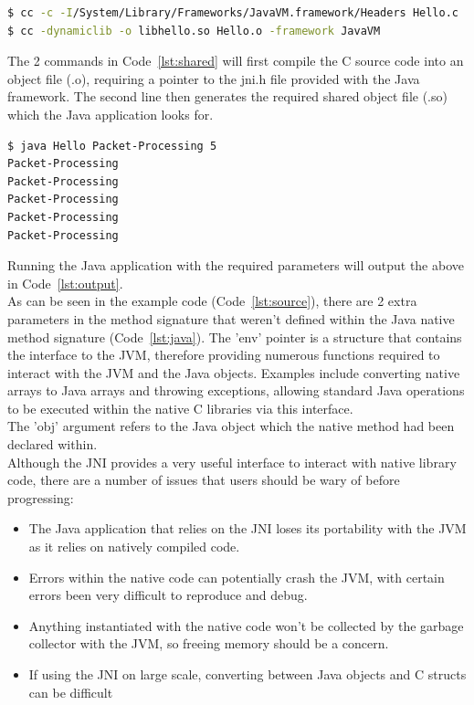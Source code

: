 \documentclass[a4paper, titlepage]{article}
\begin{document}
\begin{lstlisting}[language=sh, caption={Terminal commands to generate shared library file (.so)}, label=lst:shared]
$ cc -c -I/System/Library/Frameworks/JavaVM.framework/Headers Hello.c
$ cc -dynamiclib -o libhello.so Hello.o -framework JavaVM
\end{lstlisting}

The 2 commands in Code~\ref{lst:shared} will first compile the C source code into an object file (.o), requiring a pointer to the jni.h file provided with the Java framework. The second line then generates the required shared object file (.so) which the Java application looks for.

\begin{lstlisting}[language=sh, caption={Output from running Java application calling native C methods}, label=lst:output]
$ java Hello Packet-Processing 5
Packet-Processing
Packet-Processing
Packet-Processing
Packet-Processing
Packet-Processing
\end{lstlisting}

Running the Java application with the required parameters will output the above in Code~\ref{lst:output}. \\
\newline
As can be seen in the example code (Code~\ref{lst:source}), there are 2 extra parameters in the method signature that weren't defined within the Java native method signature (Code~\ref{lst:java}). The 'env' pointer is a structure that contains the interface to the JVM, therefore providing numerous functions required to interact with the JVM and the Java objects. Examples include converting native arrays to Java arrays and throwing exceptions, allowing standard Java operations to be executed within the native C libraries via this interface. \\
\newline
The 'obj' argument refers to the Java object which the native method had been declared within. \\
\newline
Although the JNI provides a very useful interface to interact with native library code, there are a number of issues that users should be wary of before progressing:
\begin{itemize}
	\item The Java application that relies on the JNI loses its portability with the JVM as it relies on natively compiled code.
	\item Errors within the native code can potentially crash the JVM, with certain errors been very difficult to reproduce and debug.
	\item Anything instantiated with the native code won't be collected by the garbage collector with the JVM, so freeing memory should be a concern.
	\item If using the JNI on large scale, converting between Java objects and C structs can be difficult
\end{itemize}
\end{document}
